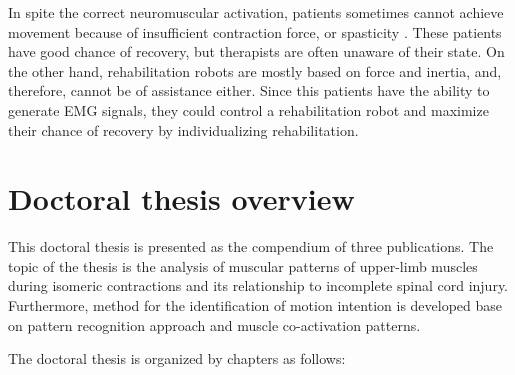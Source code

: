 In spite the correct neuromuscular activation, patients sometimes cannot achieve movement because of insufficient contraction force, or spasticity \citep{Liu2016b}. These patients have good chance of recovery, but therapists are often unaware of their state. On the other hand, rehabilitation robots are mostly based on force and inertia, and, therefore, cannot be of assistance either. Since this patients have the ability to generate EMG signals, they could control a rehabilitation robot and maximize their chance of recovery by individualizing rehabilitation.




\section {Doctoral thesis overview}

This doctoral thesis is presented as the compendium of three publications. The topic of the thesis is the analysis of muscular patterns of upper-limb muscles during isomeric contractions and its relationship to incomplete spinal cord injury. Furthermore, method for the identification of motion intention is developed base on pattern recognition approach and muscle co-activation patterns. 

The doctoral thesis is organized by chapters as follows:

